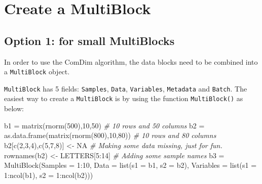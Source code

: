 \documentclass[
]{book}
\newenvironment{Shaded}{\begin{snugshade}}{\end{snugshade}}
\newcommand{\AttributeTok}[1]{\textcolor[rgb]{0.77,0.63,0.00}{#1}}
\newcommand{\CommentTok}[1]{\textcolor[rgb]{0.56,0.35,0.01}{\textit{#1}}}
\newcommand{\ConstantTok}[1]{\textcolor[rgb]{0.00,0.00,0.00}{#1}}
\newcommand{\DecValTok}[1]{\textcolor[rgb]{0.00,0.00,0.81}{#1}}
\newcommand{\FunctionTok}[1]{\textcolor[rgb]{0.00,0.00,0.00}{#1}}
\newcommand{\NormalTok}[1]{#1}
\newcommand{\OtherTok}[1]{\textcolor[rgb]{0.56,0.35,0.01}{#1}}
\newcommand{\SpecialCharTok}[1]{\textcolor[rgb]{0.00,0.00,0.00}{#1}}
\begin{document}
\hypertarget{create}{%
\chapter{Create a MultiBlock}\label{create}}

\hypertarget{option1}{%
\section{Option 1: for small MultiBlocks}\label{option1}}

In order to use the ComDim algorithm, the data blocks need to be combined
into a \texttt{MultiBlock} object.

\texttt{MultiBlock} has 5 fields: \texttt{Samples}, \texttt{Data}, \texttt{Variables},
\texttt{Metadata} and \texttt{Batch}. The easiest way to create a \texttt{MultiBlock} is by using the
function \texttt{MultiBlock()} as below:

\begin{Shaded}
\begin{Highlighting}[]
\NormalTok{b1 }\OtherTok{=} \FunctionTok{matrix}\NormalTok{(}\FunctionTok{rnorm}\NormalTok{(}\DecValTok{500}\NormalTok{),}\DecValTok{10}\NormalTok{,}\DecValTok{50}\NormalTok{) }\CommentTok{\# 10 rows and 50 columns}
\NormalTok{b2 }\OtherTok{=} \FunctionTok{as.data.frame}\NormalTok{(}\FunctionTok{matrix}\NormalTok{(}\FunctionTok{rnorm}\NormalTok{(}\DecValTok{800}\NormalTok{),}\DecValTok{10}\NormalTok{,}\DecValTok{80}\NormalTok{)) }\CommentTok{\# 10 rows and 80 columns}
\NormalTok{b2[}\FunctionTok{c}\NormalTok{(}\DecValTok{2}\NormalTok{,}\DecValTok{3}\NormalTok{,}\DecValTok{4}\NormalTok{),}\FunctionTok{c}\NormalTok{(}\DecValTok{5}\NormalTok{,}\DecValTok{7}\NormalTok{,}\DecValTok{8}\NormalTok{)] }\OtherTok{\textless{}{-}} \ConstantTok{NA} \CommentTok{\# Making some data missing, just for fun.}
\FunctionTok{rownames}\NormalTok{(b2) }\OtherTok{\textless{}{-}}\NormalTok{ LETTERS[}\DecValTok{5}\SpecialCharTok{:}\DecValTok{14}\NormalTok{] }\CommentTok{\# Adding some sample names}
\NormalTok{b3 }\OtherTok{=} \FunctionTok{MultiBlock}\NormalTok{(}\AttributeTok{Samples =} \DecValTok{1}\SpecialCharTok{:}\DecValTok{10}\NormalTok{,}
                \AttributeTok{Data =} \FunctionTok{list}\NormalTok{(}\AttributeTok{s1 =}\NormalTok{ b1, }\AttributeTok{s2 =}\NormalTok{ b2),}
                \AttributeTok{Variables =} \FunctionTok{list}\NormalTok{(}\AttributeTok{s1 =} \DecValTok{1}\SpecialCharTok{:}\FunctionTok{ncol}\NormalTok{(b1),}
                                \AttributeTok{s2 =} \DecValTok{1}\SpecialCharTok{:}\FunctionTok{ncol}\NormalTok{(b2)))}
\end{Highlighting}
\end{Shaded}
\end{document}
